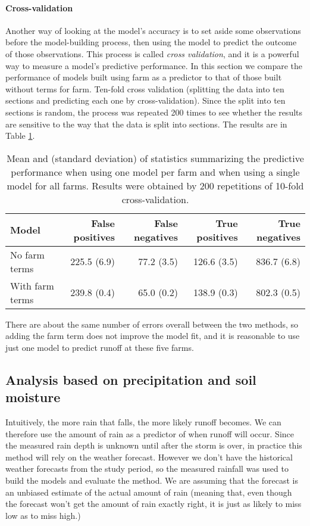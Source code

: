 \documentclass[11pt]{article}
\begin{document}
\paragraph{Cross-validation}
Another way of looking at the model's accuracy is to set aside some observations before the model-building process, then using the model to predict the outcome of those observations. This process is called \emph{cross validation}, and it is a powerful way to measure a model's predictive performance. In this section we compare the performance of models built using farm as a predictor to that of those built without terms for farm. Ten-fold cross validation (splitting the data into ten sections and predicting each one by cross-validation). Since the split into ten sections is random, the process was repeated 200 times to see whether the results are sensitive to the way that the data is split into sections. The results are in Table \ref{CV_no_precip}.\*

\begin{table}[h!]
	\centering
	\linespread{1}
	\begin{tabular}{l r r r r}
		Model & False positives & False negatives & True positives & True negatives \\
		\hline 
		No farm terms & 225.5 (6.9) & 77.2 (3.5) & 126.6 (3.5) & 836.7 (6.8) \\
		With farm terms & 239.8 (0.4) & 65.0 (0.2) & 138.9 (0.3) & 802.3 (0.5) \\
	\end{tabular}
	\caption{Mean and (standard deviation) of statistics summarizing the predictive performance when using one model per farm and when using a single model for all farms. Results were obtained by 200 repetitions of 10-fold cross-validation. \label{CV_no_precip}}
	\linespread{2}
\end{table}

There are about the same number of errors overall between the two methods, so adding the farm term does not improve the model fit, and it is reasonable to use just one model to predict runoff at these five farms.\*


\subsection{Analysis based on precipitation and soil moisture}
Intuitively, the more rain that falls, the more likely runoff becomes. We can therefore use the amount of rain as a predictor of when runoff will occur. Since the measured rain depth is unknown until after the storm is over, in practice this method will rely on the weather forecast. However we don't have the historical weather forecasts from the study period, so the measured rainfall was used to build the models and evaluate the method. We are assuming that the forecast is an unbiased estimate of the actual amount of rain (meaning that, even though the forecast won't get the amount of rain exactly right, it is just as likely to miss low as to miss high.)\*
\end{document}
